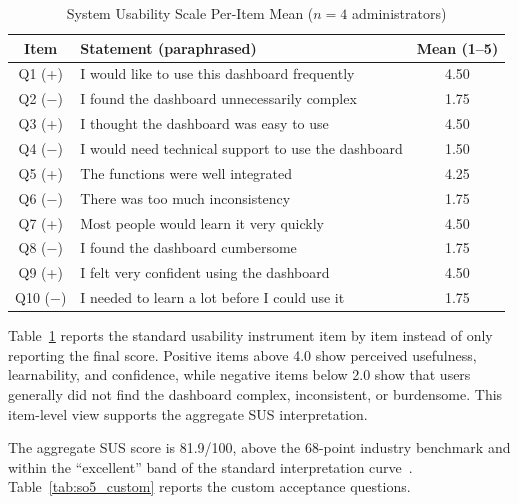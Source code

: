 \begin{table}[!htbp]
\centering
\caption{System Usability Scale Per-Item Mean ($n = 4$ administrators)}
\label{tab:so5_sus}
\scriptsize
\begin{tabular}{|c|p{}|c|}
\hline
\textbf{Item} & \textbf{Statement (paraphrased)} & \textbf{Mean (1--5)} \\
\hline
Q1 (+) & I would like to use this dashboard frequently & 4.50 \\
\hline
Q2 ($-$) & I found the dashboard unnecessarily complex & 1.75 \\
\hline
Q3 (+) & I thought the dashboard was easy to use & 4.50 \\
\hline
Q4 ($-$) & I would need technical support to use the dashboard & 1.50 \\
\hline
Q5 (+) & The functions were well integrated & 4.25 \\
\hline
Q6 ($-$) & There was too much inconsistency & 1.75 \\
\hline
Q7 (+) & Most people would learn it very quickly & 4.50 \\
\hline
Q8 ($-$) & I found the dashboard cumbersome & 1.75 \\
\hline
Q9 (+) & I felt very confident using the dashboard & 4.50 \\
\hline
Q10 ($-$) & I needed to learn a lot before I could use it & 1.75 \\
\hline
\end{tabular}
\normalsize
\end{table}

Table~\ref{tab:so5_sus} reports the standard usability instrument item by item instead of only reporting the final score. Positive items above 4.0 show perceived usefulness, learnability, and confidence, while negative items below 2.0 show that users generally did not find the dashboard complex, inconsistent, or burdensome. This item-level view supports the aggregate SUS interpretation.

The aggregate SUS score is 81.9/100, above the 68-point industry benchmark and within the ``excellent'' band of the standard interpretation curve~\cite{brooke1996sus}. Table~\ref{tab:so5_custom} reports the custom acceptance questions.

